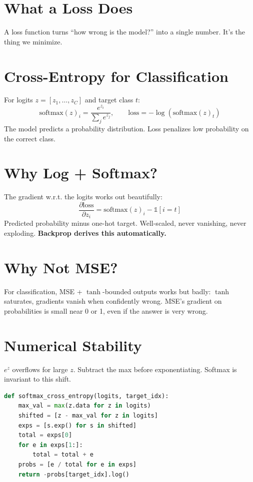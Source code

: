 \documentclass[11pt,a4paper]{book}
\begin{document}
\section{What a Loss Does}

A loss function turns ``how wrong is the model?'' into a single number. It's the thing we minimize.

\section{Cross-Entropy for Classification}

For logits $z = [z_1, \ldots, z_C]$ and target class $t$:
\begin{equation}
    \text{softmax}(z)_i = \frac{e^{z_i}}{\sum_j e^{z_j}}, \qquad
    \text{loss} = -\log(\text{softmax}(z)_t)
\end{equation}
The model predicts a probability distribution. Loss penalizes low probability on the correct class.

\section{Why Log + Softmax?}

The gradient w.r.t. the logits works out beautifully:
\begin{equation}
    \frac{\partial\text{loss}}{\partial z_i} = \text{softmax}(z)_i - \mathbb{1}[i = t]
\end{equation}
Predicted probability minus one-hot target. Well-scaled, never vanishing, never exploding.
\textbf{Backprop derives this automatically.}

\section{Why Not MSE?}

For classification, MSE + $\tanh$-bounded outputs works but badly:
$\tanh$ saturates, gradients vanish when confidently wrong. MSE's gradient on probabilities is small near 0 or 1, even if the answer is very wrong.

\section{Numerical Stability}

$e^z$ overflows for large $z$. Subtract the max before exponentiating. Softmax is invariant to this shift.
\begin{lstlisting}[language=Python, frame=single, caption={Stable softmax cross-entropy}]
def softmax_cross_entropy(logits, target_idx):
    max_val = max(z.data for z in logits)
    shifted = [z - max_val for z in logits]
    exps = [s.exp() for s in shifted]
    total = exps[0]
    for e in exps[1:]:
        total = total + e
    probs = [e / total for e in exps]
    return -probs[target_idx].log()
\end{lstlisting}
\end{document}
